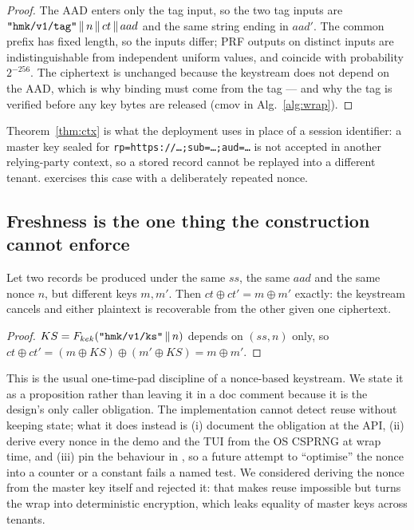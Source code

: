\begin{proof}
The AAD enters only the tag input, so the two tag inputs are
$\texttt{"hmk/v1/tag"} \,\|\, n \,\|\, ct \,\|\, aad$ and the same string
ending in $aad'$. The common prefix has fixed length, so the inputs differ;
PRF outputs on distinct inputs are indistinguishable from independent uniform
values, and coincide with probability $2^{-256}$. The ciphertext is unchanged
because the keystream does not depend on the AAD, which is why binding must
come from the tag --- and why the tag is verified before any key bytes are
released (\textsf{cmov} in Alg.~\ref{alg:wrap}).
\end{proof}

\noindent Theorem~\ref{thm:ctx} is what the deployment uses in place of a
session identifier: a master key sealed for
\texttt{rp=https://\ldots;sub=\ldots;aud=\ldots} is not accepted in another
relying-party context, so a stored record cannot be replayed into a different
tenant.  exercises this case
with a deliberately repeated nonce.

\subsection{Freshness is the one thing the construction cannot enforce}
\label{sec:fresh}

\begin{proposition}
\label{prop:nonce}
Let two records be produced under the same $ss$, the same $aad$ and the same
nonce $n$, but different keys $m, m'$. Then $ct \oplus ct' = m \oplus m'$
exactly: the keystream cancels and either plaintext is recoverable from the
other given one ciphertext.
\end{proposition}

\begin{proof}
$KS = F_{kek}(\texttt{"hmk/v1/ks"} \,\|\, n)$ depends on $(ss, n)$ only, so
$ct \oplus ct' = (m \oplus KS) \oplus (m' \oplus KS) = m \oplus m'$.
\end{proof}

\noindent This is the usual one-time-pad discipline of a nonce-based
keystream. We state it as a proposition rather than leaving it in a doc comment
because it is the design's only caller obligation. The implementation cannot
detect reuse without keeping state; what it does instead is (i) document the
obligation at the API, (ii) derive every nonce in the demo and the TUI from the
OS CSPRNG at wrap time, and (iii) pin the behaviour in
, so a future attempt to
``optimise'' the nonce into a counter or a constant fails a named test. We
considered deriving the nonce from the master key itself and rejected it: that
makes reuse impossible but turns the wrap into deterministic encryption, which
leaks equality of master keys across tenants.

